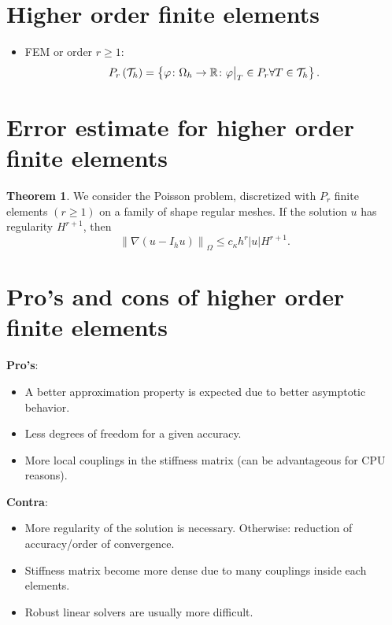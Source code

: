 \documentclass[
	a4paper,
	11pt,
	oneside
]{scrreprt}
\theoremstyle{definition}
\newtheorem{theorem}{Theorem}
\newcommand\restr[2]{{%
		\left.\kern-\nulldelimiterspace %
		#1 %
		\vphantom{\big|} %
		\right|_{#2} %
}}
\begin{document}
\section{Higher order finite elements}

\begin{itemize}
	\item FEM or order $r\ge1$: \[ P_{r}\left(\mathcal{T}_{h}\right)=\left\{\varphi\colon\Omega_{h}\rightarrow\mathbb{R}\colon\restr{\varphi}{T}\in P_r\forall T\in\mathcal{T}_h \right\}. \]
\end{itemize}

\section{Error estimate for higher order finite elements}

\begin{theorem}
We consider the Poisson problem, discretized with $P_{r}$ finite elements $\left(r\ge1\right)$ on a family of shape regular meshes. If the solution $u$ has regularity $H^{r+1}$, then \[ {\|\nabla\left(u-I_{h}u\right)\|}_{\Omega}\le c_{\kappa}h^{r}\left|u\right|H^{r+1}. \] %
\end{theorem}

\section{Pro's and cons of higher order finite elements}

\textbf{Pro's}:
\begin{itemize}
	\item A better approximation property is expected due to better asymptotic behavior.
	\item Less degrees of freedom for a given accuracy.
	\item More local couplings in the stiffness matrix (can be advantageous for CPU reasons).
\end{itemize}

\textbf{Contra}:
\begin{itemize}
	\item More regularity of the solution is necessary. Otherwise: reduction of accuracy/order of convergence.
	\item Stiffness matrix become more dense due to many couplings inside each elements.
	\item Robust linear solvers are usually more difficult.
\end{itemize}
\end{document}
